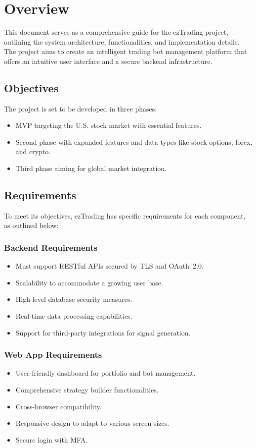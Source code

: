 
\section{Overview}
\label{sec:overview}

This document serves as a comprehensive guide for the ezTrading project, outlining the system architecture, functionalities, and implementation details. The project aims to create an intelligent trading bot management platform that offers an intuitive user interface and a secure backend infrastructure.

\subsection{Objectives}
\label{sec:objectives}
The project is set to be developed in three phases: 
\begin{itemize}
  \item MVP targeting the U.S. stock market with essential features.
  \item Second phase with expanded features and data types like stock options, forex, and crypto.
  \item Third phase aiming for global market integration.
\end{itemize}


\subsection{Requirements}
\label{subsec:requirements}
To meet its objectives, ezTrading has specific requirements for each component, as outlined below:

\subsubsection{Backend Requirements}
\begin{itemize}
  \item Must support RESTful APIs secured by TLS and OAuth~2.0.
  \item Scalability to accommodate a growing user base.
  \item High-level database security measures.
  \item Real-time data processing capabilities.
  \item Support for third-party integrations for signal generation.
\end{itemize}

\subsubsection{Web App Requirements}
\begin{itemize}
  \item User-friendly dashboard for portfolio and bot management.
  \item Comprehensive strategy builder functionalities.
  \item Cross-browser compatibility.
  \item Responsive design to adapt to various screen sizes.
  \item Secure login with MFA.
\end{itemize}

